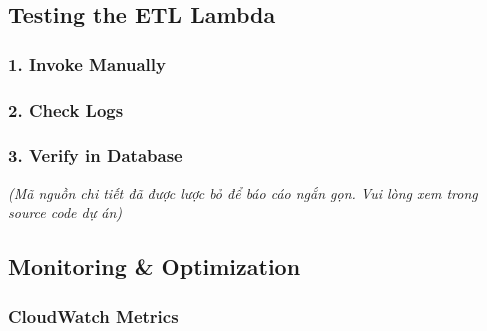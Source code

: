\hypertarget{testing-the-etl-lambda}{%
\subsection{Testing the ETL Lambda}}

\hypertarget{invoke-manually}{%
\subsubsection{1. Invoke Manually}}

\begin{Shaded}
\begin{Highlighting}[]
\DataTypeTok{\textbackslash{}}
  \DataTypeTok{\textbackslash{}}
   \StringTok{\textquotesingle{}\{\}\textquotesingle{}} \DataTypeTok{\textbackslash{}}

\end{Highlighting}
\end{Shaded}

\hypertarget{check-logs}{%
\subsubsection{2. Check Logs}}

\begin{Shaded}
\begin{Highlighting}[]
\end{Highlighting}
\end{Shaded}

\hypertarget{verify-in-database}{%
\subsubsection{3. Verify in Database}}

\emph{(Mã nguồn chi tiết đã được lược bỏ để báo cáo ngắn gọn. Vui lòng
xem trong source code dự án)}

\hypertarget{monitoring-optimization}{%
\subsection{Monitoring \& Optimization}}

\hypertarget{cloudwatch-metrics}{%
\subsubsection{CloudWatch Metrics}}

